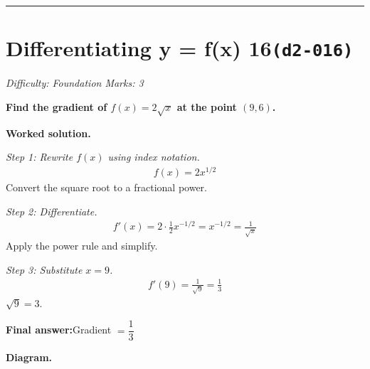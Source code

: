 \documentclass[11pt]{article}
\newcommand{\question}[1]{\par\medskip\noindent\textbf{#1}\par}
\begin{document}
\medskip\hrule

\section*{Differentiating y = f(x) 16\quad\small\texttt{(d2-016)}}
\textit{Difficulty: Foundation \quad\textbar\quad Marks: 3}

\question{Find the gradient of \( f(x) = 2\sqrt{x} \) at the point \( (9, 6) \).}

\textbf{Worked solution.}

\textit{Step 1: Rewrite \( f(x) \) using index notation.}
\[\begin{gathered}
f(x) = 2x^{1/2}
\end{gathered}\]
Convert the square root to a fractional power.

\textit{Step 2: Differentiate.}
\[\begin{gathered}
f'(x) = 2 \cdot \tfrac{1}{2} x^{-1/2} = x^{-1/2} = \frac{1}{\sqrt{x}}
\end{gathered}\]
Apply the power rule and simplify.

\textit{Step 3: Substitute \( x = 9 \).}
\[\begin{gathered}
f'(9) = \frac{1}{\sqrt{9}} = \frac{1}{3}
\end{gathered}\]
\( \sqrt{9} = 3 \).

\begin{answerbox}
\textbf{Final answer:}\quad Gradient \(\displaystyle  = \dfrac{1}{3} \)
\end{answerbox}
\textbf{Diagram.}
\end{document}
